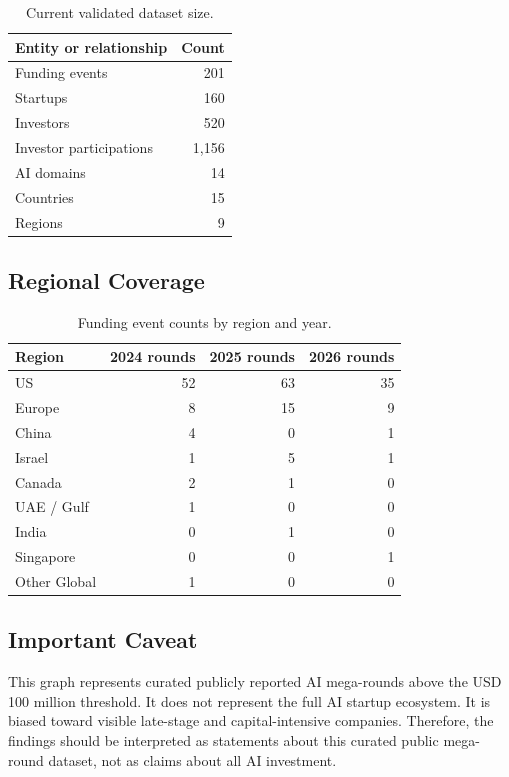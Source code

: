 \documentclass[11pt,a4paper]{article}
\begin{document}
\begin{table}[H]
\centering
\begin{tabular}{lr}
\toprule
Entity or relationship & Count \\
\midrule
Funding events & 201 \\
Startups & 160 \\
Investors & 520 \\
Investor participations & 1,156 \\
AI domains & 14 \\
Countries & 15 \\
Regions & 9 \\
\bottomrule
\end{tabular}
\caption{Current validated dataset size.}
\end{table}

\subsection{Regional Coverage}

\begin{table}[H]
\centering
\begin{tabular}{lrrr}
\toprule
Region & 2024 rounds & 2025 rounds & 2026 rounds \\
\midrule
US & 52 & 63 & 35 \\
Europe & 8 & 15 & 9 \\
China & 4 & 0 & 1 \\
Israel & 1 & 5 & 1 \\
Canada & 2 & 1 & 0 \\
UAE / Gulf & 1 & 0 & 0 \\
India & 0 & 1 & 0 \\
Singapore & 0 & 0 & 1 \\
Other Global & 1 & 0 & 0 \\
\bottomrule
\end{tabular}
\caption{Funding event counts by region and year.}
\end{table}

\subsection{Important Caveat}

This graph represents curated publicly reported AI mega-rounds above the USD
100 million threshold. It does not represent the full AI startup ecosystem. It
is biased toward visible late-stage and capital-intensive companies. Therefore,
the findings should be interpreted as statements about this curated public
mega-round dataset, not as claims about all AI investment.
\end{document}
